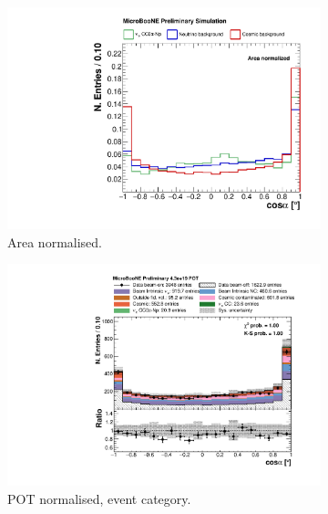 \begin{figure}[htbp]
\centering
  \begin{subfigure}{0.49\textwidth}
    \includegraphics[width=\linewidth]{figures/h_track_shower_angle_norm.pdf}
    \caption{Area normalised.} \label{fig:angle_integral}
  \end{subfigure}
  \begin{subfigure}{0.49\textwidth}
    \includegraphics[width=\linewidth]{figures/h_track_shower_angle.pdf}
    \caption{POT normalised, event category.} \label{fig:angle_pot}
  \end{subfigure}
  \begin{subfigure}{0.49\textwidth}

\end{subfigure}
\end{figure}
